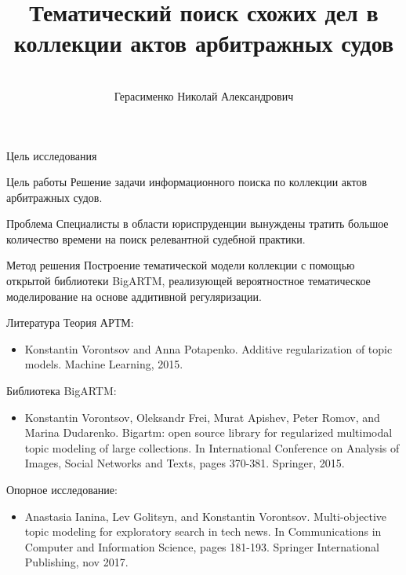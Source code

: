 \documentclass{beamer}
\title[\hbox to 56mm{Тематический поиск схожих дел\hfill\insertframenumber\,/\,\inserttotalframenumber}]
{Тематический поиск схожих дел в коллекции актов арбитражных судов}
\author[Н.\,А. Герасименко]{\large \\Герасименко Николай Александрович}
\institute{\large
Московский авиационный институт}
\date{\footnotesize{\emph{Курс:} Численные методы обучения по прецедентам\par (практика, В.\,В. Стрижов)/Группа 8О-103М, весна 2019}}
\begin{document}
\begin{frame}
\titlepage
\end{frame}
\begin{frame}{Цель исследования}
\begin{block}{Цель работы}
	Решение задачи информационного поиска по коллекции актов арбитражных судов.
    \end{block}
\begin{block}{Проблема}
	Специалисты в области юриспруденции вынуждены тратить большое количество времени на поиск релевантной судебной практики.
    \end{block}
\begin{block}{Метод решения}
	Построение тематической модели коллекции с помощью открытой библиотеки BigARTM, реализующей вероятностное тематическое моделирование на основе аддитивной регуляризации.
    \end{block}
\end{frame}
\begin{frame}{Литература}
Теория АРТМ:
    \begin{itemize}
        \item Konstantin Vorontsov and Anna Potapenko. Additive regularization of topic models. Machine Learning, 2015.
    \end{itemize} 
Библиотека BigARTM:
    \begin{itemize}
        \item Konstantin Vorontsov, Oleksandr Frei, Murat Apishev, Peter Romov, and Marina Dudarenko. Bigartm: open source library for regularized multimodal topic modeling of large collections.
In International Conference on Analysis of Images, Social Networks and Texts, pages 370-381. Springer, 2015.
    \end{itemize} 
Опорное исследование:
    \begin{itemize}
        \item Anastasia Ianina, Lev Golitsyn, and Konstantin Vorontsov. Multi-objective topic modeling for exploratory search in tech news. In Communications in Computer and Information Science, pages 181-193. Springer International Publishing, nov 2017.
    \end{itemize} 
\end{frame}
\end{document}
